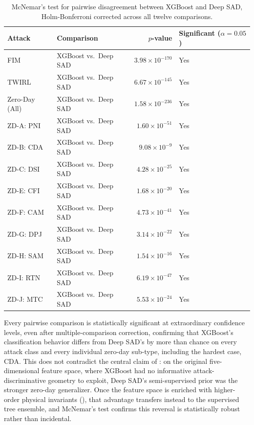 \documentclass[12pt, a4paper]{report}
\begin{document}
\begin{table}[H]
\centering
\caption{McNemar's test for pairwise disagreement between XGBoost and Deep SAD, Holm-Bonferroni corrected across all twelve comparisons.}
\label{tab:mcnemar}
\begin{tabular}{@{}llrl@{}}
\toprule
\textbf{Attack} & \textbf{Comparison} & \textbf{$p$-value} & \textbf{Significant ($\alpha=0.05$)} \\
\midrule
FIM             & XGBoost vs.\ Deep SAD & $3.98  \times 10^{-170}$ & Yes \\
TWIRL           & XGBoost vs.\ Deep SAD & $6.67  \times 10^{-145}$ & Yes \\
Zero-Day (All)  & XGBoost vs.\ Deep SAD & $1.58  \times 10^{-236}$ & Yes \\
ZD-A: PNI       & XGBoost vs.\ Deep SAD & $1.60  \times 10^{-51}$  & Yes \\
ZD-B: CDA       & XGBoost vs.\ Deep SAD & $9.08  \times 10^{-9}$   & Yes \\
ZD-C: DSI       & XGBoost vs.\ Deep SAD & $4.28  \times 10^{-25}$  & Yes \\
ZD-E: CFI       & XGBoost vs.\ Deep SAD & $1.68  \times 10^{-20}$  & Yes \\
ZD-F: CAM       & XGBoost vs.\ Deep SAD & $4.73  \times 10^{-41}$  & Yes \\
ZD-G: DPJ       & XGBoost vs.\ Deep SAD & $3.14  \times 10^{-22}$  & Yes \\
ZD-H: SAM       & XGBoost vs.\ Deep SAD & $1.54  \times 10^{-16}$  & Yes \\
ZD-I: RTN       & XGBoost vs.\ Deep SAD & $6.19  \times 10^{-47}$  & Yes \\
ZD-J: MTC       & XGBoost vs.\ Deep SAD & $5.53  \times 10^{-24}$  & Yes \\
\bottomrule
\end{tabular}
\end{table}

Every pairwise comparison is statistically significant at extraordinary confidence levels, even after multiple-comparison correction, confirming that XGBoost's classification behavior differs from Deep SAD's by more than chance on every attack class and every individual zero-day sub-type, including the hardest case, CDA. This does not contradict the central claim of : on the original five-dimensional feature space, where XGBoost had no informative attack-discriminative geometry to exploit, Deep SAD's semi-supervised prior was the stronger zero-day generalizer. Once the feature space is enriched with higher-order physical invariants (), that advantage transfers instead to the supervised tree ensemble, and McNemar's test confirms this reversal is statistically robust rather than incidental.
\end{document}
